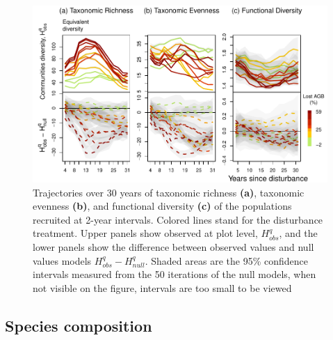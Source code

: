 \documentclass[fleqn,10pt]{ArtEcoFoG} %
\begin{document}
\begin{figure}

{\centering \includegraphics{RecruitmentTrajectories_files/figure-latex/DivTraj-1} 

}

\caption{Trajectories over 30 years of taxonomic richness \textbf{(a)}, taxonomic evenness \textbf{(b)}, and functional diversity \textbf{(c)} of the populations recruited at 2-year intervals. Colored lines stand for the disturbance treatment. Upper panels show observed at plot level, $H_{obs}^q$, and the lower panels show the difference between observed values and null values models $H_{obs}^q - H_{null}^q$. Shaded areas are the 95\% confidence intervals measured from the 50 iterations of the null models, when not visible on the figure, intervals are too small to be viewed}\label{fig:DivTraj}
\end{figure}

\hypertarget{species-composition}{%
\subsection{Species composition}\label{species-composition}}
\end{document}

